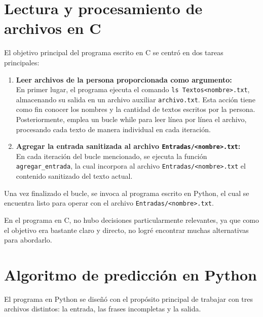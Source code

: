 \documentclass{article}
\begin{document}



\section{Lectura y procesamiento de archivos en C}
El objetivo principal del programa escrito en C se centró en dos tareas principales:

\begin{enumerate}
    \item \textbf{Leer archivos de la persona proporcionada como argumento:} \\
    En primer lugar, el programa ejecuta el comando \texttt{ls Textos<nombre>.txt}, almacenando su salida en un archivo auxiliar 
    \texttt{archivo.txt}. Esta acción tiene como fin conocer los nombres y la cantidad de textos escritos por la persona. Posteriormente, emplea un bucle while para leer línea por línea el archivo, procesando cada texto de manera individual en cada iteración.

    \item \textbf{Agregar la entrada sanitizada al archivo \texttt{Entradas/<nombre>.txt}:} \\
    En cada iteración del bucle mencionado, se ejecuta la función \texttt{agregar\_entrada}, la cual incorpora al archivo 
    \texttt{Entradas/<nombre>.txt} el contenido sanitizado del texto actual.
\end{enumerate}

Una vez finalizado el bucle, se invoca al programa escrito en Python, el cual se encuentra listo para operar
 con el archivo \texttt{Entradas/<nombre>.txt}.

En el programa en C, no hubo decisiones particularmente relevantes, ya que como el objetivo era bastante claro y directo, no logré encontrar muchas alternativas para abordarlo.

\section{Algoritmo de predicción en Python}
El programa en Python se diseñó con el propósito principal de trabajar con tres archivos distintos: la entrada, las frases incompletas y la salida.
\end{document}
